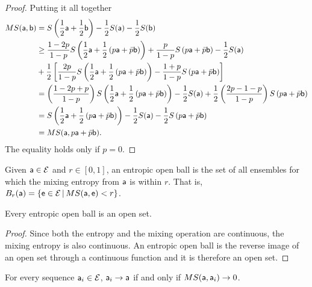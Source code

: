 \begin{proof}
	Putting it all together
	\begin{equation}
		\begin{aligned}
			MS(\ens[a],\ens[b]) &= S\left(\frac{1}{2} \ens[a] + \frac{1}{2} \ens[b]\right)- \frac{1}{2} S(\ens[a]) - \frac{1}{2} S(\ens[b]) \\
			&\geq \frac{1-2p}{1-p}S\left(\frac{1}{2} \ens[a] + \frac{1}{2}\left(p\ens[a] + \bar{p} \ens[b]\right)\right) + \frac{p}{1-p} S\left(p\ens[a] + \bar{p} \ens[b]\right) - \frac{1}{2} S(\ens[a]) \\
			&+ \frac{1}{2}\left[\frac{2p}{1-p} S\left(\frac{1}{2} \ens[a] + \frac{1}{2}\left(p\ens[a] + \bar{p} \ens[b]\right)\right) - \frac{1+p}{1-p} S\left(p \ens[a] + \bar{p} \ens[b] \right)\right] \\
			&= \left(\frac{1-2p + p}{1-p}\right)S\left(\frac{1}{2} \ens[a] + \frac{1}{2}\left(p\ens[a] + \bar{p} \ens[b]\right)\right) - \frac{1}{2} S(\ens[a]) + \frac{1}{2}\left(\frac{2p-1-p}{1-p}\right) S\left(p\ens[a] + \bar{p} \ens[b]\right) \\
			&= S\left(\frac{1}{2} \ens[a] + \frac{1}{2}\left(p\ens[a] + \bar{p} \ens[b]\right)\right) - \frac{1}{2} S(\ens[a]) - \frac{1}{2} S\left(p\ens[a] + \bar{p} \ens[b]\right) \\
			&= MS(\ens[a], p\ens[a] + \bar{p} \ens[b]).
		\end{aligned}
	\end{equation}
	The equality holds only if $p=0$.
\end{proof}

\begin{defn}
	Given $\ens[a] \in \Ens$ and $r \in [0,1]$, an entropic open ball is the set of all ensembles for which the mixing entropy from $\ens[a]$ is within $r$. That is, $B_r(\ens[a]) = \{\ens \in \Ens \, | \, MS(\ens[a], \ens) < r\}$.
\end{defn}

\begin{coro}
	Every entropic open ball is an open set.
\end{coro}

\begin{proof}
	Since both the entropy and the mixing operation are continuous, the mixing entropy is also continuous. An entropic open ball is the reverse image of an open set through a continuous function and it is therefore an open set.
\end{proof}

\begin{prop}
	For every sequence $\ens[a]_i \in \Ens$, $\ens[a]_i \to \ens[a]$ if and only if $MS(\ens[a], \ens[a]_i) \to 0$.
\end{prop}

